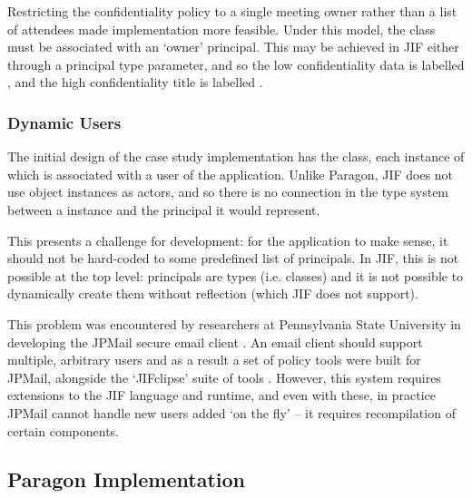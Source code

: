 Restricting the confidentiality policy to a single meeting owner rather than a list of attendees made implementation more feasible. Under this model, the  class must be associated with an `owner' principal. This may be achieved in JIF either through a principal type parameter, and so the low confidentiality data is labelled , and the high confidentiality title is labelled .

\subsubsection{Dynamic Users}

The initial design of the case study implementation has the  class, each instance of which is associated with a user of the application. Unlike Paragon, JIF does not use object instances as actors, and so there is no connection in the type system between a  instance and the principal it would represent.

This presents a challenge for development: for the application to make sense, it should not be hard-coded to some predefined list of principals. In JIF, this is not possible at the top level: principals are types (i.e. classes) and it is not possible to dynamically create them without reflection (which JIF does not support).

This problem was encountered by researchers at Pennsylvania State University in developing the JPMail secure email client \cite{jpmailpage}. An email client should support multiple, arbitrary users and as a result a set of policy tools were built for JPMail, alongside the `JIFclipse' suite of tools \cite{hicks2007jifclipse}. However, this system requires extensions to the JIF language and runtime, and even with these, in practice JPMail cannot handle new users added `on the fly' -- it requires recompilation of certain components.


\subsection{Paragon Implementation}

